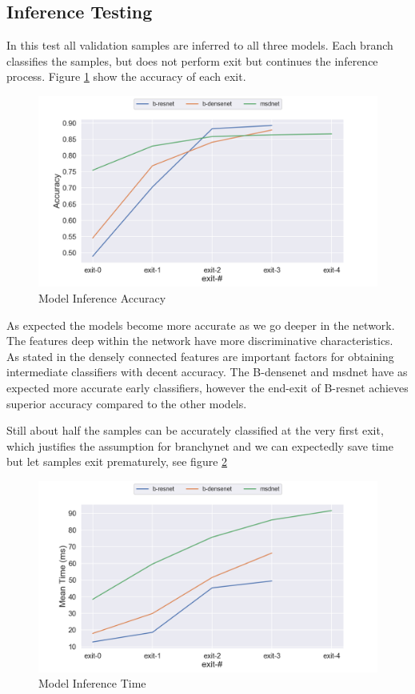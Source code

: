 \subsection{Inference Testing}

In this test all validation samples are inferred to all three models. Each branch classifies the samples, but does not perform exit but continues the inference process. Figure \ref{fig:exit-accuracy} show the accuracy of each exit.  

\begin{figure}
	\includegraphics[width=\linewidth]{figures/inference_plots/exit_acc}
	\caption[Model Inference Accuracy]{Model Inference Accuracy}
	\label{fig:exit-accuracy}
\end{figure}

As expected the models become more accurate as we go deeper in the network. The features deep within the network have more discriminative characteristics. As stated in \cite{huang_multi-scale_2017} the densely connected features are important factors for obtaining intermediate classifiers with decent accuracy. The B-\gls{densenet} and \gls{msdnet} have as expected more accurate early classifiers, however the end-exit of B-\gls{resnet} achieves superior accuracy compared to the other models.

Still about half the samples can be accurately classified at the very first exit, which justifies the assumption for \gls{branchynet} and we can expectedly save time but let samples exit prematurely, see figure \ref{fig:exit-time}

\begin{figure}
	\includegraphics[width=\linewidth]{figures/inference_plots/exit_time}
	\caption[Model Inference Accuracy]{Model Inference Time}
	\label{fig:exit-time}
\end{figure}

